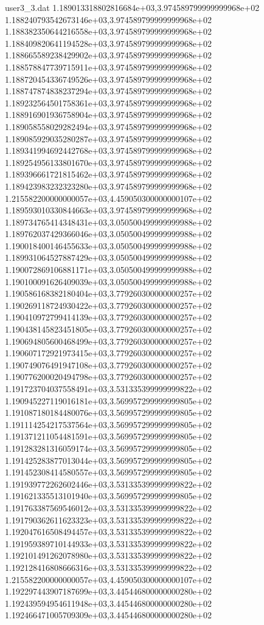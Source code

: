 \begin{filecontents}{user3_3.dat}
1.189013318802816684e+03,3.974589799999999968e+02
1.188240793542673146e+03,3.974589799999999968e+02
1.188382350644216558e+03,3.974589799999999968e+02
1.188409820641194528e+03,3.974589799999999968e+02
1.188665589238429902e+03,3.974589799999999968e+02
1.188578847739715911e+03,3.974589799999999968e+02
1.188720454336749526e+03,3.974589799999999968e+02
1.188747874838237294e+03,3.974589799999999968e+02
1.189232564501758361e+03,3.974589799999999968e+02
1.188916901936758904e+03,3.974589799999999968e+02
1.189058558029282494e+03,3.974589799999999968e+02
1.189085929035280287e+03,3.974589799999999968e+02
1.189341994692442768e+03,3.974589799999999968e+02
1.189254956133801670e+03,3.974589799999999968e+02
1.189396661721815462e+03,3.974589799999999968e+02
1.189423983232323280e+03,3.974589799999999968e+02
1.215582200000000057e+03,4.459050300000000107e+02
1.189593010330844663e+03,3.974589799999999968e+02
1.189734765414348431e+03,3.050500499999999988e+02
1.189762037429366046e+03,3.050500499999999988e+02
1.190018400146455633e+03,3.050500499999999988e+02
1.189931064527887429e+03,3.050500499999999988e+02
1.190072869106881171e+03,3.050500499999999988e+02
1.190100091626409039e+03,3.050500499999999988e+02
1.190586168382180404e+03,3.779260300000000257e+02
1.190269118724930422e+03,3.779260300000000257e+02
1.190410972799414139e+03,3.779260300000000257e+02
1.190438145823451805e+03,3.779260300000000257e+02
1.190694805600468499e+03,3.779260300000000257e+02
1.190607172921973415e+03,3.779260300000000257e+02
1.190749076491947108e+03,3.779260300000000257e+02
1.190776200020494798e+03,3.779260300000000257e+02
1.191723704037558491e+03,3.531335399999999822e+02
1.190945227119016181e+03,3.569957299999999805e+02
1.191087180184480076e+03,3.569957299999999805e+02
1.191114254217537564e+03,3.569957299999999805e+02
1.191371211054481591e+03,3.569957299999999805e+02
1.191283281316059174e+03,3.569957299999999805e+02
1.191425283877013044e+03,3.569957299999999805e+02
1.191452308414580557e+03,3.569957299999999805e+02
1.191939772262602446e+03,3.531335399999999822e+02
1.191621335513101940e+03,3.569957299999999805e+02
1.191763387569546012e+03,3.531335399999999822e+02
1.191790362611623323e+03,3.531335399999999822e+02
1.192047616508494457e+03,3.531335399999999822e+02
1.191959389710144933e+03,3.531335399999999822e+02
1.192101491262078980e+03,3.531335399999999822e+02
1.192128416808666316e+03,3.531335399999999822e+02
1.215582200000000057e+03,4.459050300000000107e+02
1.192297443907187699e+03,3.445446800000000280e+02
1.192439594954611948e+03,3.445446800000000280e+02
1.192466471005709309e+03,3.445446800000000280e+02

\end{filecontents}
